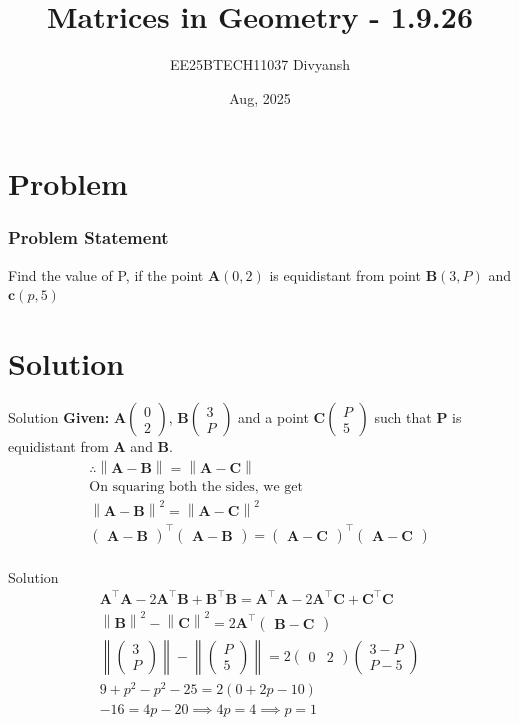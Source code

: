 \documentclass{beamer}
\title{Matrices in Geometry - 1.9.26}
\author{EE25BTECH11037  Divyansh}
\date{Aug, 2025}
\let\vec\mathbf
\providecommand{\brak}[1]{\ensuremath{\left(#1\right)}}
\theoremstyle{remark}
\providecommand{\norm}[1]{\left\lVert#1\right\rVert}
\newcommand{\myvec}[1]{\ensuremath{\begin{pmatrix}#1\end{pmatrix}}}
\begin{document}
\maketitle


\section{Problem}
\begin{frame}
\frametitle{Problem Statement}
Find the value of P, if the point $\vec{A}\brak{0,2}$ is equidistant from point $\vec{B}\brak{3,P}$ and $\vec{c}\brak{p,5}$
\end{frame}

\section{Solution}
\begin{frame}{Solution}
   \textbf{Given: } 
$\vec{A}\myvec{0\\2}$, $\vec{B}\myvec{3\\P}$ and a point $\vec{C} \myvec{P\\ 5}$ such that $\vec{P}$ is equidistant from $\vec{A}$ and $\vec{B}$. 
\begin{align}
    \therefore \norm{\vec{A}-\vec{B}}=\norm{\vec{A}-\vec{C}}\\
    \text{On squaring both the sides, we get }\\
    \norm{\vec{A}-\vec{B}}^2=\norm{\vec{A}-\vec{C}}^2\\
    \myvec{\vec{A}-\vec{B}}^{\top}\myvec{\vec{A}-\vec{B}}=\myvec{\vec{A}-\vec{C}}^{\top}\myvec{\vec{A}-\vec{C}}\\
\end{align}
\end{frame}

\begin{frame}{Solution}
\begin{align}
\vec{A}^{\top}\vec{A} - 2\vec{A}^{\top}\vec{B} + \vec{B}^{\top}\vec{B} =\vec{A}^{\top}\vec{A} - 2\vec{A}^{\top}\vec{C} + \vec{C}^{\top}\vec{C}\\
    \norm{\vec{B}}^2 - \norm{\vec{C}}^2=2\vec{A}^{\top}\myvec{\vec{B}-\vec{C}}\\
    \norm{\myvec{3\\P}} - \norm{\myvec{P\\5}}=2\myvec{0 & 2}\myvec{3-P \\ P-5}\\
    9 + p^2 - p^2 -25 = 2\brak{0+2p-10}\\
    -16=4p - 20 \implies 4p =4 \implies p=1
\end{align}
\end{frame}
\end{document}
